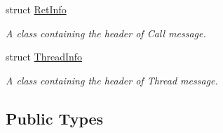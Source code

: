 \begin{DoxyCompactItemize}
struct \hyperlink{struct_message_1_1_ret_info}{Ret\-Info}
\begin{DoxyCompactList}\small\item\em A class containing the header of Call message. \end{DoxyCompactList}\item 
struct \hyperlink{struct_message_1_1_thread_info}{Thread\-Info}
\begin{DoxyCompactList}\small\item\em A class containing the header of Thread message. \end{DoxyCompactList}\end{DoxyCompactItemize}
\subsection*{Public Types}
